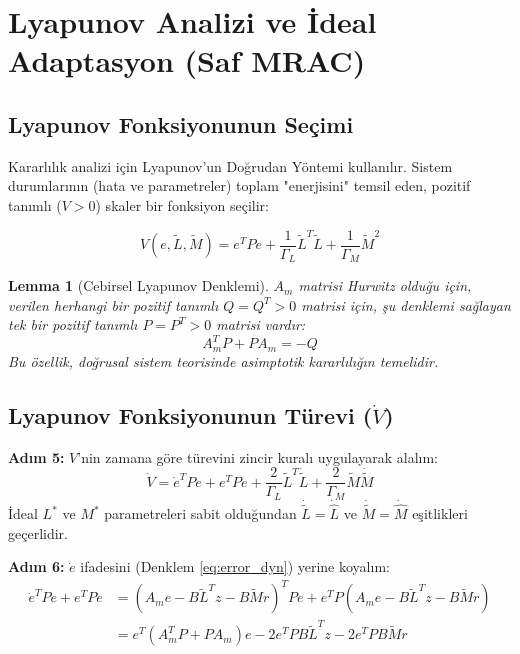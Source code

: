 \documentclass[12pt,a4paper]{article}
\newtheorem{lemma}{Lemma}
\begin{document}
\section{Lyapunov Analizi ve İdeal Adaptasyon (Saf MRAC)}

\subsection{Lyapunov Fonksiyonunun Seçimi}
Kararlılık analizi için Lyapunov'un Doğrudan Yöntemi kullanılır. Sistem durumlarının (hata ve parametreler) toplam "enerjisini" temsil eden, pozitif tanımlı ($V > 0$) skaler bir fonksiyon seçilir:

\begin{equation}
    V(e, \tilde{L}, \tilde{M}) = e^T P e + \frac{1}{\Gamma_L} \tilde{L}^T \tilde{L} + \frac{1}{\Gamma_M} \tilde{M}^2
    \label{eq:lyapunov}
\end{equation}

\begin{lemma}[Cebirsel Lyapunov Denklemi]
$A_m$ matrisi Hurwitz olduğu için, verilen herhangi bir pozitif tanımlı $Q = Q^T > 0$ matrisi için, şu denklemi sağlayan tek bir pozitif tanımlı $P = P^T > 0$ matrisi vardır:
\begin{equation}
    A_m^T P + P A_m = -Q
\end{equation}
Bu özellik, doğrusal sistem teorisinde asimptotik kararlılığın temelidir.
\end{lemma}

\subsection{Lyapunov Fonksiyonunun Türevi ($\dot{V}$)}
\textbf{Adım 5:} $V$'nin zamana göre türevini zincir kuralı uygulayarak alalım:
\begin{equation}
    \dot{V} = \dot{e}^T P e + e^T P \dot{e} + \frac{2}{\Gamma_L} \tilde{L}^T \dot{\tilde{L}} + \frac{2}{\Gamma_M} \tilde{M} \dot{\tilde{M}}
\end{equation}
İdeal $L^*$ ve $M^*$ parametreleri sabit olduğundan $\dot{\tilde{L}} = \dot{\hat{L}}$ ve $\dot{\tilde{M}} = \dot{\hat{M}}$ eşitlikleri geçerlidir. 

\textbf{Adım 6:} $\dot{e}$ ifadesini (Denklem \ref{eq:error_dyn}) yerine koyalım:
\begin{align}
    \dot{e}^T P e + e^T P \dot{e} &= (A_m e - B \tilde{L}^T z - B \tilde{M} r)^T P e + e^T P (A_m e - B \tilde{L}^T z - B \tilde{M} r) \nonumber \\
    &= e^T (A_m^T P + P A_m) e - 2 e^T P B \tilde{L}^T z - 2 e^T P B \tilde{M} r
\end{align}
\end{document}
